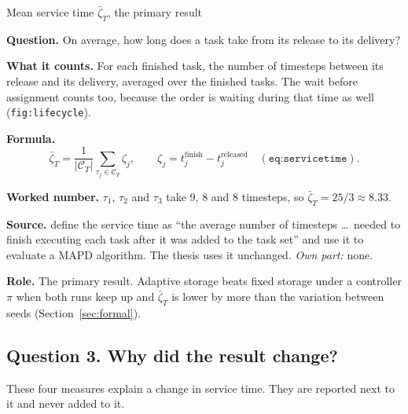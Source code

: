 \documentclass[11pt,a4paper]{article}
\newcommand{\row}[1]{\par\smallskip\noindent\textbf{#1}\enspace}
\begin{document}
\begin{card}{Mean service time $\bar\zeta_T$, the primary result}
\row{Question.} On average, how long does a task take from its release to
its delivery?

\row{What it counts.} For each finished task, the number of timesteps
between its release and its delivery, averaged over the finished tasks.
The wait before assignment counts too, because the order is waiting during
that time as well (\texttt{fig:lifecycle}).

\row{Formula.}
\[
  \bar\zeta_T = \frac{1}{|\mathcal{C}_T|}\sum_{\tau_j\in\mathcal{C}_T}\zeta_j,
  \qquad \zeta_j = t_j^{\mathrm{finish}} - t_j^{\mathrm{released}}
  \quad (\texttt{eq:servicetime}).
\]

\row{Worked number.} $\tau_1$, $\tau_2$ and $\tau_3$ take $9$, $8$ and $8$
timesteps, so $\bar\zeta_T = 25/3 \approx 8.33$.

\row{Source.} \citet{ma2017lifelong_mapf} define the service time as ``the
average number of timesteps \ldots\ needed to finish executing each task
after it was added to the task set'' and use it to evaluate a MAPD
algorithm. The thesis uses it unchanged. \emph{Own part:} none.

\row{Role.} The primary result. Adaptive storage beats fixed storage under
a controller $\pi$ when both runs keep up and $\bar\zeta_T$ is lower by
more than the variation between seeds (Section~\ref{sec:formal}).
\end{card}

\subsection{Question 3. Why did the result change?}

These four measures explain a change in service time. They are reported
next to it and never added to it.
\end{document}
